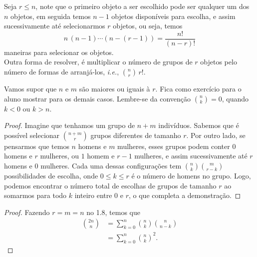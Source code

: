 \begin{questions}

\setcounter{question}{2}
\begin{solution}
Seja $r \leq n$, note que o primeiro objeto a ser escolhido pode ser qualquer um dos $n$ objetos, em seguida temos $n-1$ objetos disponíveis para escolha, e assim sucessivamente até selecionarmos $r$ objetos, ou seja, temos
\[ n\,(n-1) \cdots (n-(r-1)) = \dfrac{n!}{(n-r)!} \]
maneiras para selecionar os objetos.\\
Outra forma de resolver, é multiplicar o número de grupos de $r$ objetos pelo número de formas de arranjá-los, \textit{i.e.}, $\binom{n}{r}\,r!$.
\end{solution}

\setcounter{question}{7}
\begin{solution}
Vamos supor que $n$ e $m$ são maiores ou iguais à $r$. Fica como exercício para o aluno mostrar para os demais casos. Lembre-se da convenção $\binom{n}{k}=0$, quando $k<0$ ou $k>n$.
\begin{proof}
Imagine que tenhamos um grupo de $n+m$ indivíduos. Sabemos que é possível selecionar $\binom{n+m}{r}$ grupos diferentes de tamanho $r$. Por outro lado, se pensarmos que temos $n$ homens e $m$ mulheres, esses grupos podem conter $0$ homens e $r$ mulheres, ou $1$ homem e $r-1$ mulheres, e assim sucessivamente até $r$ homens e $0$ mulheres. Cada uma dessas configurações tem $\binom{n}{k}\binom{m}{r-k}$ possibilidades de escolha, onde $0\leq k\leq r$ é o número de homens no grupo. Logo, podemos encontrar o número total de escolhas de grupos de tamanho $r$ ao somarmos para todo $k$ inteiro entre $0$ e $r$, o que completa a demonstração.
\end{proof}
\end{solution}

\begin{solution}
\begin{proof}
Fazendo $r=m=n$ no 1.8, temos que
\begin{align*}
\binom{2n}{n}
	&= \sum_{k=0}^{n} \binom{n}{k}\binom{n}{n-k}\\
	&= \sum_{k=0}^{n} \binom{n}{k}^2.
\end{align*}
\end{proof}
\end{solution}


\end{questions}
